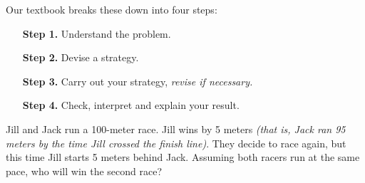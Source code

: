 \documentclass[12pt]{article}
\begin{document}
Our textbook breaks these down into four steps:
\begin{enumerate}
\item[\bf Step 1.] Understand the problem.
\item[\bf Step 2.] Devise a strategy.
\item[\bf Step 3.] Carry out your strategy, \emph{revise if necessary.}
\item[\bf Step 4.] Check, interpret and explain your result.
\end{enumerate}

\vspace{0.5in}

Jill and Jack run a 100-meter race. Jill wins by 5 meters \emph{(that is, Jack ran 95 meters by the time Jill crossed the finish line)}. They decide to race again, but this time Jill starts 5 meters behind Jack. Assuming both racers run at the same pace, who will win the second race?

\vspace{2in}
\end{document}
